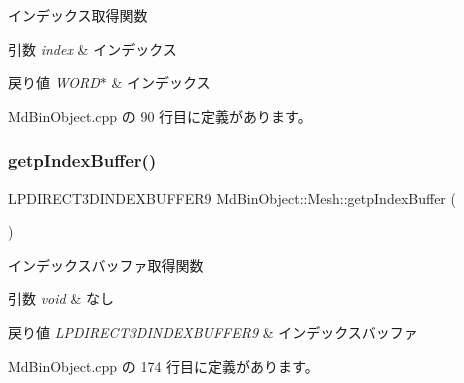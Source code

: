 インデックス取得関数 


\begin{DoxyParams}{引数}
{\em index} & インデックス \\
\hline
\end{DoxyParams}

\begin{DoxyRetVals}{戻り値}
{\em W\+O\+R\+D$\ast$} & インデックス \\
\hline
\end{DoxyRetVals}


 Md\+Bin\+Object.\+cpp の 90 行目に定義があります。

\mbox{\label{class_md_bin_object_1_1_mesh_a5a8c1392a554808067e27163c942cf02}} 
\subsubsection{\texorpdfstring{getp\+Index\+Buffer()}{getpIndexBuffer()}}
{\footnotesize\ttfamily L\+P\+D\+I\+R\+E\+C\+T3\+D\+I\+N\+D\+E\+X\+B\+U\+F\+F\+E\+R9 Md\+Bin\+Object\+::\+Mesh\+::getp\+Index\+Buffer (\begin{DoxyParamCaption}{ }\end{DoxyParamCaption})}



インデックスバッファ取得関数 


\begin{DoxyParams}{引数}
{\em void} & なし \\
\hline
\end{DoxyParams}

\begin{DoxyRetVals}{戻り値}
{\em L\+P\+D\+I\+R\+E\+C\+T3\+D\+I\+N\+D\+E\+X\+B\+U\+F\+F\+E\+R9} & インデックスバッファ \\
\hline
\end{DoxyRetVals}


 Md\+Bin\+Object.\+cpp の 174 行目に定義があります。

\mbox{\label{class_md_bin_object_1_1_mesh_ad97e4b5005a2522fbebb1b8d3318cd14}} 
